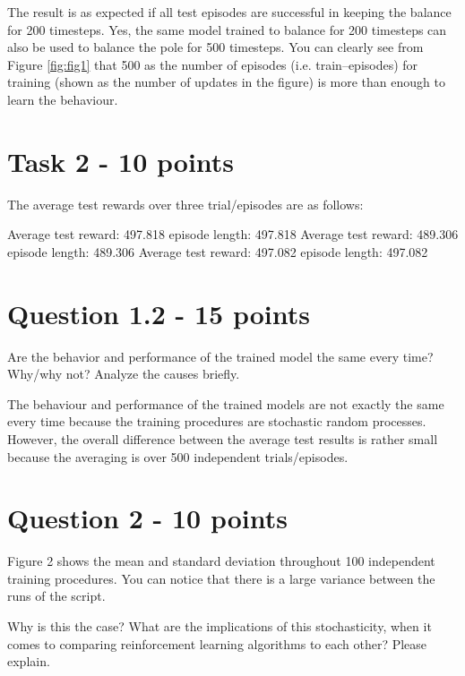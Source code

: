 \documentclass[12pt]{article}
\begin{document}
\noindent
The result is as expected if all test episodes are successful in keeping the balance for 200 timesteps.
\newline
\newline
\noindent
Yes, the same model trained to balance for 200 timesteps can also be used to balance the pole for 500 timesteps. 
You can clearly see from Figure \ref*{fig:fig1} that 500 as the number of episodes (i.e. train--episodes) for training (shown as the number of updates in the figure) is more than enough to learn the behaviour. 

\section*{Task 2 - 10 points}

The average test rewards over three trial/episodes are as follows:
\newline

Average test reward: 497.818 episode length: 497.818
\newline
\indent
Average test reward: 489.306 episode length: 489.306
\newline
\indent
Average test reward: 497.082 episode length: 497.082

\section*{Question 1.2 - 15 points}

Are the behavior and performance of the trained model the same every time?
Why/why not? Analyze the causes briefly.
\newline

\noindent
The behaviour and performance of the trained models are not exactly the same every time because the training procedures are stochastic random processes. However, the overall difference between the average test results is rather small because the averaging is over 500 independent trials/episodes.


\section*{Question 2 - 10 points}

Figure 2 shows the mean and standard deviation throughout 100 independent training procedures. You can notice that there is a large variance between the runs of the script.
\newline

Why is this the case? What are the implications of this stochasticity, when it comes to comparing reinforcement learning algorithms to each other? Please explain.
\newline
\end{document}
